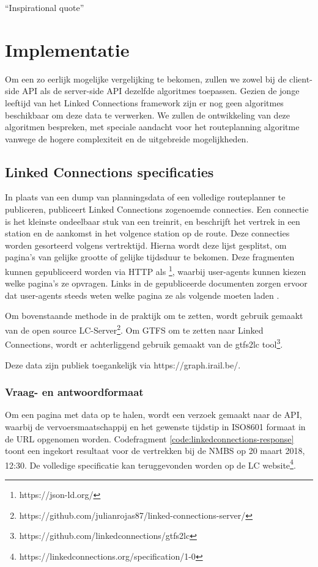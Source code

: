 \begin{savequote}[0.55\linewidth]
	``Inspirational quote''
\end{savequote}

\chapter{Implementatie}
\label{chap:implementatie}

Om een zo eerlijk mogelijke vergelijking te bekomen, zullen we zowel bij de client-side API als de server-side API dezelfde algoritmes toepassen. Gezien de jonge leeftijd van het Linked Connections framework zijn er nog geen algoritmes beschikbaar om deze data te verwerken. We zullen de ontwikkeling van deze algoritmen bespreken, met speciale aandacht voor het routeplanning algoritme vanwege de hogere complexiteit en de uitgebreide mogelijkheden.

\section{Linked Connections specificaties}
\label{sec:lcformaat}
In plaats van een dump van planningsdata of een volledige routeplanner te publiceren, publiceert Linked Connections zogenoemde connecties. Een connectie is het kleinste ondeelbaar stuk van een treinrit, en beschrijft het vertrek in een station en de aankomst in het volgence station op de route. Deze connecties worden gesorteerd volgens vertrektijd. Hierna wordt deze lijst gesplitst, om pagina's van gelijke grootte of gelijke tijdsduur te bekomen. Deze fragmenten kunnen gepubliceerd worden via HTTP als \footnote{https://json-ld.org/}, waarbij user-agents kunnen kiezen welke pagina's ze opvragen. Links in de gepubliceerde documenten zorgen ervoor dat user-agents steeds weten welke pagina ze als volgende moeten laden \citep{linkedconnections18}.

Om bovenstaande methode in de praktijk om te zetten, wordt gebruik gemaakt van de open source LC-Server\footnote{https://github.com/julianrojas87/linked-connections-server/}. Om GTFS om te zetten naar Linked Connections, wordt er achterliggend gebruik gemaakt van de gtfs2lc tool\footnote{https://github.com/linkedconnections/gtfs2lc}.

Deze data zijn publiek toegankelijk via https://graph.irail.be/.

\subsection{Vraag- en antwoordformaat}
Om een pagina met data op te halen, wordt een verzoek gemaakt naar de API, waarbij de vervoersmaatschappij en het gewenste tijdstip in ISO8601 formaat in de URL opgenomen worden.  Codefragment \ref{code:linkedconnections-response} toont een ingekort resultaat voor de vertrekken bij de NMBS op 20 maart 2018, 12:30. De volledige specificatie kan teruggevonden worden op de LC website\footnote{https://linkedconnections.org/specification/1-0}.

